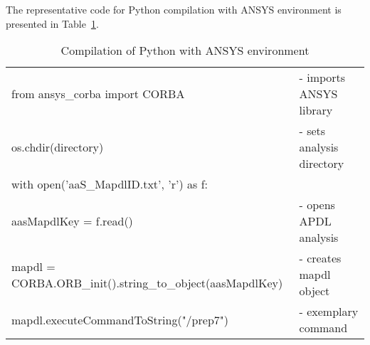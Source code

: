 
The representative code for Python compilation with ANSYS environment is presented in Table~\ref{table:ansys_python_compilation}.

\begin{table}[h!]
    \caption{Compilation of Python with ANSYS environment} 
    \vspace{-1em} 
    \fontsize{10}{10}
    \selectfont 
    \renewcommand{\arraystretch}{1}
    \begin{center}
    \begin{tabular}{ ll }  
    \hline  
        from ansys\_corba import CORBA & - imports ANSYS library \\
        os.chdir(directory) & - sets analysis directory\\
        with open('aaS\_MapdlID.txt', 'r') as f: \\ aasMapdlKey = f.read() & - opens APDL analysis \\
        mapdl = CORBA.ORB\_init().string\_to\_object(aasMapdlKey) & - creates mapdl object \\
    \hline
        mapdl.executeCommandToString("/prep7") & - exemplary command \\
     \end{tabular} 
    \end{center}  
     \label{table:ansys_python_compilation} 
 \end{table}
\newpage